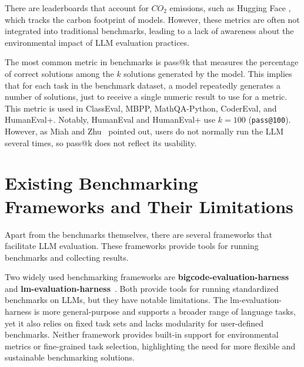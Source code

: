 There are leaderboards that account for $CO_2$ emissions, such as Hugging Face \cite{huggingfaceCalculation}, which tracks the carbon footprint of models. However, these metrics are often not integrated into traditional benchmarks, leading to a lack of awareness about the environmental impact of LLM evaluation practices.

The most common metric in benchmarks is pass@k that measures the percentage of correct solutions among the $k$ solutions generated by the model.
This implies that for each task in the benchmark dataset, a model repeatedly generates a number of solutions, just to receive a single numeric result to use for a metric.
This metric is used in ClassEval, MBPP, MathQA-Python, CoderEval, and HumanEval+.
Notably, HumanEval and HumanEval+ use $k=100$ (\texttt{pass@100}).
However, as Miah and Zhu~\cite{miah2024usercentricevaluationcode} pointed out, users do not normally run the LLM several times, so pass@k does not reflect its usability.

\section{Existing Benchmarking Frameworks and Their Limitations}

Apart from the benchmarks themselves, there are several frameworks that facilitate LLM evaluation.
These frameworks provide tools for running benchmarks and collecting results.

Two widely used benchmarking frameworks are \textbf{bigcode-evaluation-harness}~\cite{bigcode-evaluation-harness} and \textbf{lm-evaluation-harness}~\cite{githubGitHubEleutherAIlmevaluationharness}.
Both provide tools for running standardized benchmarks on LLMs, but they have notable limitations.
The lm-evaluation-harness is more general-purpose and supports a broader range of language tasks, yet it also relies on fixed task sets and lacks modularity for user-defined benchmarks.
Neither framework provides built-in support for environmental metrics or fine-grained task selection, highlighting the need for more flexible and sustainable benchmarking solutions.

